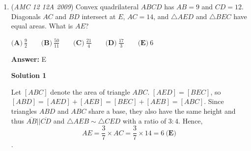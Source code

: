 \begin{enumerate}
 Now, finding the angles in the triangles and applying trig functions to find these radii, we get the following:

 $A_{1}$ = $\cot 36^\circ$
$A_{2}$ = $\cot \frac {180}{7}^\circ$
$H_{1}$ = $\csc 36^\circ$
$H_{2}$ = $\csc \frac {180}{7}^\circ$

 Now, the areas in between the circles are:

 $\text{Pentagon circles}$ = $\pi((\csc 36^\circ)^2 - (\cot 36^\circ)^2)$
$\text{Heptagon circles}$ = $\pi((\csc \frac {180}{7}^\circ)^2 - (\cot \frac {180}{7}^\circ)^2)$

 Note the trig identity $(\cot\theta)^2 +1 = (\csc\theta)^2$, from which we can easily get that $(\csc\theta)^2 - (\cot\theta)^2 = 1$

 Thus, the area between the circles in both the heptagon and the pentagon are equivalent to $\pi$, and therefore the answer is $\boxed{\textbf{(C) }A=B}$.

 



\textbf{Solution 3}

Note that the answer choices all include powers of $5$ and $7$. This indicates that the answer must depend on the number of sides the two shapes have. 

 For simplicity, we solve the same problem with triangle and square instead of pentagon and heptagon. For the triangle setup, $A = \left(\frac{2}{\sqrt{3}}\right)^2 \cdot \pi - \left(\frac{1}{\sqrt{3}}\right)^2 \cdot \pi = \pi.$ For the square setup, $B = \left(\sqrt{2}\right)^2 \cdot \pi - \left(1\right)^2 \cdot \pi = \pi.$

 Since $A = B$ for the triangle-square case, it should be the same for the pentagon-heptagon case. Therefore, we choose $\boxed{\textbf{(C) } A=B }$.

 


	\item (\textit{AMC 12 12A 2009}) Convex quadrilateral $ABCD$ has $AB = 9$ and $CD = 12$.  Diagonals $AC$ and $BD$ intersect at $E$, $AC = 14$, and $\triangle AED$ and $\triangle BEC$ have equal areas.  What is $AE$?


 $\textbf{(A)}\ \frac {9}{2}\qquad \textbf{(B)}\ \frac {50}{11}\qquad \textbf{(C)}\ \frac {21}{4}\qquad \textbf{(D)}\ \frac {17}{3}\qquad \textbf{(E)}\ 6$

 \textbf{Answer: }E



\textbf{Solution 1}

Let $[ABC]$ denote the area of triangle $ABC$. $[AED] = [BEC]$, so $[ABD] = [AED] + [AEB] = [BEC] + [AEB] = [ABC]$. Since triangles $ABD$ and $ABC$ share a base, they also have the same height and thus $\overline{AB}||\overline{CD}$ and $\triangle{AEB}\sim\triangle{CED}$ with a ratio of $3: 4$. Hence, 
 \[AE = \frac {3}{7}\times AC = \frac {3}{7}\times 14 = 6\ \boxed{\textbf{(E)}}\].


\end{enumerate}
